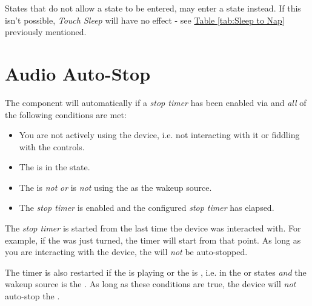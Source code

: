States that do not allow a  state to be entered, may enter a
 state instead.  If this isn't possible, \textit{Touch Sleep} will
have no effect - see \hyperref[tab:Sleep to Nap]{Table \ref*{tab:Sleep to Nap}}
previously mentioned.


\section{Audio Auto-Stop} \label{Power - Stop}

The  component will automatically  if a \textit{stop timer} has
been enabled via \hyperref[Power Settings]{} and \textit{all} of the
following conditions are met:

\begin{itemize}
  \item You are not actively using the device, i.e. not interacting with it or
    fiddling with the controls.
  \item The  is in the  state.
  \item The  is \textit{not}  \textit{or} is \textit{not} using
    the  as the wakeup source.
  \item The \textit{stop timer} is enabled and the configured
    \textit{stop timer} has elapsed.
\end{itemize}

The \textit{stop timer} is started from the last time the device was interacted
with.  For example, if the  was just turned, the timer will start from
that point.  As long as you are interacting with the device, the  will
\textit{not} be auto-stopped.

\par\medskip

The timer is also restarted if the  is playing or the  is
, i.e. in the  or  states \textit{and}
the wakeup source is the .  As long as these conditions are true,
the device will \textit{not} auto-stop the .

